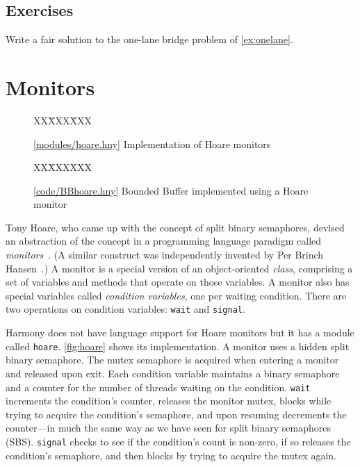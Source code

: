 \documentclass{report}
\newcommand{\harmonysource}[1]{
\begin{tabbing}
XX\=XXX\=XXX\kill
    
\end{tabbing}
}
\newcommand{\harmonylink}[1]{%
[\href{https://harmony.cs.cornell.edu/#1}{\underline{#1}}]%
}
\newenvironment{code}{
\tcolorbox
}{
\endtcolorbox
}
\begin{document}
\section*{Exercises}
\begin{problems}
\item Write a fair solution to the one-lane bridge problem of
\autoref{ex:onelane}.
\end{problems}

\chapter{Monitors}
\label{ch:monitors}

%
%

\begin{figure}
\begin{code}
\harmonysource{hoare}
\end{code}
\caption{\harmonylink{modules/hoare.hny} Implementation of Hoare monitors}
\label{fig:hoare}
\end{figure}

\begin{figure}
\begin{code}
\harmonysource{BBhoare}
\end{code}
\caption{\harmonylink{code/BBhoare.hny} Bounded Buffer implemented using
a Hoare monitor}
\label{fig:hoaretest}
\end{figure}

Tony Hoare, who came up with the concept of split binary semaphores, devised
an abstraction of the concept in a programming language paradigm called
\emph{monitors}~\cite{Hoare74}.
%
(A similar construct was independently invented by Per Brinch Hansen~\cite{BH73}.)
A monitor is a special version of an object-oriented \emph{class}, comprising
a set of variables and methods that operate on those variables.
A monitor also has special variables called \emph{condition variables},
one per waiting condition.
There are two operations on condition variables: \texttt{wait}
%
and
\texttt{signal}.
%

Harmony does not have language support for Hoare monitors but it
has a module called \texttt{hoare}.
\autoref{fig:hoare} shows its implementation.
A monitor uses a hidden split binary semaphore.
The mutex semaphore is acquired when entering a monitor and released
upon exit.
Each condition variable maintains a binary semaphore and a counter for
the number of threads waiting on the condition.
\texttt{wait} increments the condition's counter, releases the monitor mutex,
blocks while trying to acquire the condition's semaphore, and upon resuming
decrements the counter---in much the same way as we have seen for split binary
semaphores (SBS).
\texttt{signal} checks to see if the condition's count is non-zero, if so
releases the condition's semaphore,
and then blocks by trying to acquire the mutex again.
\end{document}
